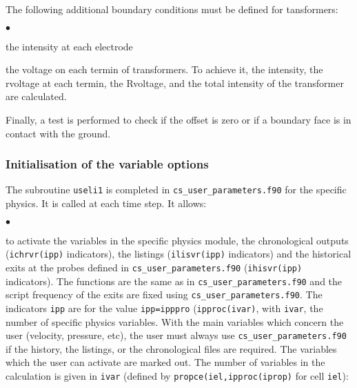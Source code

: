 {{

The following additional boundary conditions must be defined for tansformers:
\begin{list}{$\bullet$}{}
\item  the intensity at each electrode
\item  the voltage on each termin of transformers. To achieve it, the intensity,
 the rvoltage at each termin, the Rvoltage, and the total intensity of the 
transformer are calculated. 
\end{list}

Finally, a test is performed to check if the offset is zero or if a boundary
 face is in contact with the ground.

\subsubsection {Initialisation of the variable options}
\label{prg_useli1}%

The subroutine \texttt{useli1} is completed in \texttt{cs\_user\_parameters.f90} for the specific
 physics. It is called at each time step. It allows:
\begin{list}{$\bullet$}{}
\item to activate the variables in the specific physics module, the chronological
outputs (\texttt{ichrvr(ipp)} indicators), the listings (\texttt{ilisvr(ipp)}
indicators) and the
historical exits at the probes defined in \texttt{cs\_user\_parameters.f90} (\texttt{ihisvr(ipp)}
indicators).
The functions are the same as in \texttt{cs\_user\_parameters.f90} and the script frequency of the
exits are fixed using \texttt{cs\_user\_parameters.f90}. The indicators \texttt{ipp} are for the
 value \texttt{ipp=ipppro} (\texttt{ipproc(ivar)}, with \texttt{ivar}, the number
 of specific physics variables. With the main variables
 which concern the user (velocity, pressure, etc), the user must always use
 \texttt{cs\_user\_parameters.f90} if the history, the listings, or the chronological files are required.
 The variables which the user can activate are marked out. The number of variables in
the calculation is given in \texttt{ivar} (defined by
\texttt{propce(iel,ipproc(iprop)} for cell \texttt{iel}):


\end{list}}}
